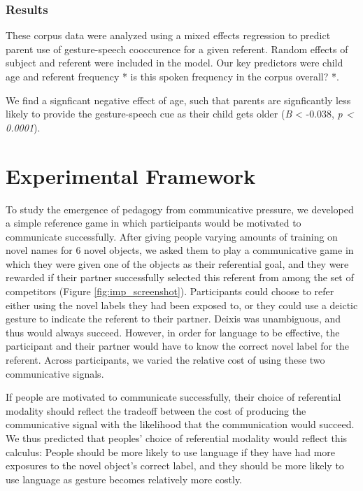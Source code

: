 \documentclass[10pt, letterpaper]{article}
\begin{document}
\subsubsection{Results}\label{results}

These corpus data were analyzed using a mixed effects regression to
predict parent use of gesture-speech cooccurence for a given referent.
Random effects of subject and referent were included in the model. Our
key predictors were child age and referent frequency * is this spoken
frequency in the corpus overall? *.

We find a signficant negative effect of age, such that parents are
signficantly less likely to provide the gesture-speech cue as their
child gets older (\emph{B} \textless{} -0.038, \emph{p \textless{}
0.0001}).

\section{Experimental Framework}\label{experimental-framework}

To study the emergence of pedagogy from communicative pressure, we
developed a simple reference game in which participants would be
motivated to communicate successfully. After giving people varying
amounts of training on novel names for 6 novel objects, we asked them to
play a communicative game in which they were given one of the objects as
their referential goal, and they were rewarded if their partner
successfully selected this referent from among the set of competitors
(Figure \ref{fig:imp_screenshot}). Participants could choose to refer
either using the novel labels they had been exposed to, or they could
use a deictic gesture to indicate the referent to their partner. Deixis
was unambiguous, and thus would always succeed. However, in order for
language to be effective, the participant and their partner would have
to know the correct novel label for the referent. Across participants,
we varied the relative cost of using these two communicative signals.

If people are motivated to communicate successfully, their choice of
referential modality should reflect the tradeoff between the cost of
producing the communicative signal with the likelihood that the
communication would succeed. We thus predicted that peoples' choice of
referential modality would reflect this calculus: People should be more
likely to use language if they have had more exposures to the novel
object's correct label, and they should be more likely to use language
as gesture becomes relatively more costly.
\end{document}
